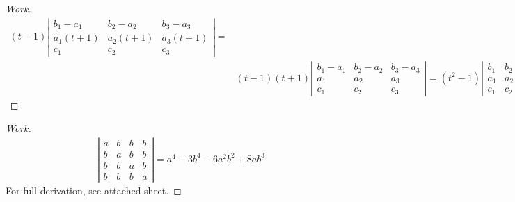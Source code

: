 \documentclass{article}
\begin{document}
\begin{proof}[Work]
\begin{align*}
        (t-1)
        \left\lvert \begin{array}{ccc}
                        b_1 - a_1  & b_2 - a_2  & b_3 - a_3  \\
                        a_1(t + 1) & a_2(t + 1) & a_3(t + 1) \\
                        c_1        & c_2        & c_3
                    \end{array} \right\rvert =                                                          \\
         & (t-1)(t + 1)
        \left\lvert \begin{array}{ccc}
                        b_1 - a_1 & b_2 - a_2 & b_3 - a_3 \\
                        a_1       & a_2       & a_3       \\
                        c_1       & c_2       & c_3
                    \end{array} \right\rvert =
        (t^2-1)
        \left\lvert \begin{array}{ccc}
                        b_1 & b_2 & b_3 \\
                        a_1 & a_2 & a_3 \\
                        c_1 & c_2 & c_3
                    \end{array} \right\rvert =
        (1-t^2)
        \left\lvert \begin{array}{ccc}
                        a_1 & a_2 & a_3 \\
                        b_1 & b_2 & b_3 \\
                        c_1 & c_2 & c_3
                    \end{array} \right\rvert
    \end{align*}
\end{proof}
\qdash

\begin{proof}[Work]
    \begin{align*}
        \left\lvert \begin{array}{cccc}
                        a & b & b & b \\
                        b & a & b & b \\
                        b & b & a & b \\
                        b & b & b & a
                    \end{array} \right\rvert = a^4 - 3b^4 -6a^2b^2 + 8ab^3
    \end{align*}
    For full derivation, see attached sheet.
\end{proof}
\qdash
\end{document}
